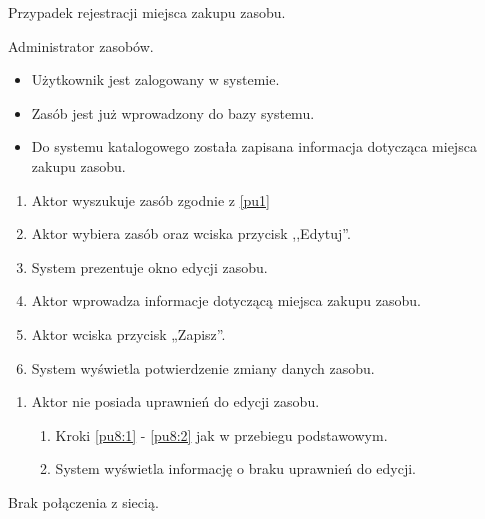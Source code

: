 Przypadek rejestracji miejsca zakupu zasobu.

Administrator zasobów.

\begin{itemize}
\item Użytkownik jest zalogowany w systemie.
\item Zasób jest już wprowadzony do bazy systemu.
\end{itemize}

\begin{itemize}
\item Do systemu katalogowego została zapisana informacja dotycząca miejsca zakupu zasobu.
\end{itemize}

\begin{enumerate}
	\item \label{pu8:1} Aktor wyszukuje zasób zgodnie z \ref{pu1}
	\item \label{pu8:2} Aktor wybiera zasób oraz wciska przycisk ,,Edytuj''.
	\item System prezentuje okno edycji zasobu.
	\item Aktor wprowadza informacje dotyczącą miejsca zakupu zasobu.
	\item Aktor wciska przycisk „Zapisz”.
	\item System wyświetla potwierdzenie zmiany danych zasobu.
\end{enumerate}

\begin{enumerate}
	\item Aktor nie posiada uprawnień do edycji zasobu.
	\begin{enumerate}[label*=\arabic*.]
		\item Kroki \ref{pu8:1} - \ref{pu8:2} jak w przebiegu podstawowym.
		\item System wyświetla informację o braku uprawnień do edycji.
	\end{enumerate}
\end{enumerate}

Brak połączenia z siecią.

